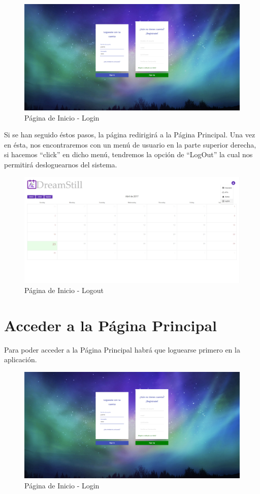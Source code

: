 \documentclass[11pt,openany]{book}
\begin{document}
\begin{figure}[H]
\centering
\includegraphics[totalheight=7cm]{manualUsuario/login.png}
\caption{Página de Inicio - Login}
\end{figure}

Si se han seguido éstos pasos, la página redirigirá a la Página Principal. Una vez en ésta, nos encontraremos con un menú de usuario en la parte superior derecha, si hacemos ``click'' en dicho menú, tendremos la opción de ``LogOut'' la cual nos permitirá desloguearnos del sistema.

\begin{figure}[H]
\centering
\includegraphics[totalheight=7cm]{manualUsuario/logout.png}
\caption{Página de Inicio - Logout}
\end{figure}

\section{Acceder a la Página Principal}

Para poder acceder a la Página Principal habrá que loguearse primero en la aplicación.

\begin{figure}[H]
\centering
\includegraphics[totalheight=7cm]{manualUsuario/login.png}
\caption{Página de Inicio - Login}
\end{figure}
\end{document}
